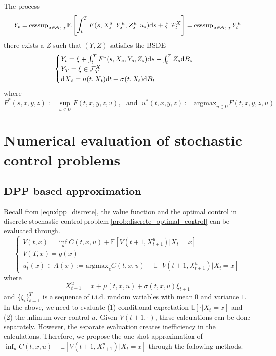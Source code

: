 \documentclass[11pt]{book}
\newcommand{\dd}{\text{\normalfont d}}
\newcommand{\dt}{\text{\normalfont d}t}
\newcommand{\ds}{\text{\normalfont d}s}
\newcommand{\dX}{\text{\normalfont d}X}
\begin{document}
\begin{thm}
The process 
\begin{equation}
Y_t=\mathrm{esssup}_{u\in\mathcal{A}_{t,T}}\mathbb{E}\left[\int_t^TF(s,X^u_s,Y^u_s,Z^u_s,u_s){{\ds}}+\xi\Big|\mathcal{F}^X_t\right]=\mathrm{esssup}_{u\in\mathcal{A}_{t,T}}Y_t^u
\end{equation}
there exists a $Z$ such that $(Y,Z)$
satisfies the BSDE
\begin{equation}
\begin{cases}
Y_t=\xi+\int_t^TF^*(s,X_s,Y_s,Z_s){{\ds}}-\int_t^TZ_s{\dd}B_s\\
Y_T=\xi\in\mathcal{F}^{X}_T\\
{\dX}_t=\mu(t,X_t){{\dt}}+\sigma(t,X_t){\dd}B_t
\end{cases}
\end{equation}
where
\begin{equation}
F^*(s,x,y,z):=\sup_{u\in U}F(t,x,y,z,u),~~~\textrm{and}~~~u^*(t,x,y,z):=\mathrm{argmax}_{u\in U}F(t,x,y,z,u)
\end{equation}
\end{thm}
\chapter{Numerical evaluation of stochastic control problems}



\section{DPP based approximation}
Recall from \eqref{eqn:dpp_discrete}, the value function and the optimal control in discrete stochastic control problem \eqref{prob:discrete_optimal_control} can be evaluated through.
\begin{equation}\label{eqn:dpp_discrete_numerical}
    \begin{cases}
        V(t,x)= \inf_{u}
    C(t,x,u) + \mathbb{E}[V(t+1,X^u_{t+1})|X_t=x]\\
    V(T,x)=g(x)\\
    u^*_t(x)\in A(x):=\textrm{argmax}_{u}
    C(t,x,u) + \mathbb{E}[V(t+1,X^u_{t+1})|X_t=x]
    \end{cases}
\end{equation}
where
\begin{equation}
    X^u_{t+1}=x+\mu(t,x,u)+\sigma(t,x,u)\xi_{t+1}
\end{equation}
and $\{\xi_t\}_{t=1}^T$ is a sequence of i.i.d. random variables with mean $0$ and variance $1$. In the above, we need to evaluate (1) conditional expectation $\mathbb{E}[\cdot|X_t=x]$ and (2) the infimum over control $u$. Given $V(t+1,\cdot)$, these calculations can be done separately. However, the separate evaluation creates inefficiency in the calculations. Therefore, we propose the one-shot approximation of $\inf_{u}C(t,x,u) + \mathbb{E}[V(t+1,X^u_{t+1})|X_t=x]$ through the following methods. 
\end{document}
